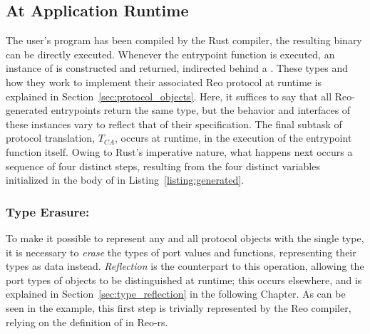 
\subsection{At Application Runtime}
\label{sec:translation_phase_2}

The user's program has been compiled by the Rust compiler, the resulting binary can be directly executed. Whenever the entrypoint function is executed, an instance of  is constructed and returned, indirected behind a . These types and how they work to implement their associated Reo protocol at runtime is explained in Section~\ref{sec:protocol_objects}. Here, it suffices to say that all Reo-generated entrypoints return the same  type, but the behavior and interfaces of these instances vary to reflect that of their specification. The final subtask of protocol translation, $T_{CA}$, occurs at runtime, in the execution of the entrypoint function itself. Owing to Rust's imperative nature, what happens next occurs a sequence of four distinct steps, resulting from the four distinct variables initialized in the body of  in Listing~\ref{listing:generated}.

\subsubsection{Type Erasure: }
To make it possible to represent any and all protocol objects with the single  type, it is necessary to \textit{erase} the types of port values and functions, representing their types as data instead. \textit{Reflection} is the counterpart to this operation, allowing the port types of  objects to be distinguished at runtime; this occurs elsewhere, and is explained in Section~\ref{sec:type_reflection} in the following Chapter. As can be seen in the example, this first step is trivially represented by the Reo compiler, relying on the definition of  in Reo-rs.

